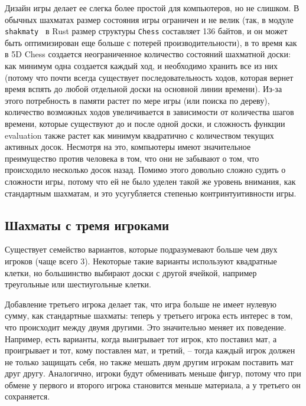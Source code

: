 \documentclass{article}
\begin{document}
Дизайн игры делает ее слегка более простой для компьютеров, но не слишком.
В обычных шахматах размер состояния игры ограничен и не велик
(так, в модуле \texttt{shakmaty}~\cite{shakmaty-crate} в Rust размер структуры \texttt{Chess} составляет 136 байтов,
и он может быть оптимизирован еще больше с потерей производительности),
в то время как в 5D Chess создается неограниченное количество состояний шахматной доски:
как минимум одна создается каждый ход,
и необходимо хранить все из них
(потому что почти всегда существует последовательность ходов,
которая вернет время вспять до любой отдельной доски на основной линии времени).
Из-за этого потребность в памяти растет по мере игры (или поиска по дереву),
количество возможных ходов увеличивается в зависимости от количества шагов времени, которые существуют до и после одной доски,
и сложность функции evaluation также растет как минимум квадратично с количеством текущих активных досок.
Несмотря на это, компьютеры имеют значительное преимущество против человека в том,
что они не забывают о том, что происходило несколько досок назад.
Помимо этого довольно сложно судить о сложности игры,
потому что ей не было уделен такой же уровень внимания, как стандартным шахматам,
и это усугубляется степенью контринтуитивности игры. 

\subsection{Шахматы с тремя игроками}

Существует семейство вариантов,
которые подразумевают больше чем двух игроков
(чаще всего 3).
Некоторые такие варианты используют квадратные клетки,
но большинство выбирают доски с другой ячейкой,
например треугольные или шестиугольные клетки.

Добавление третьего игрока делает так, что игра больше не имеет нулевую сумму,
как стандартные шахматы:
теперь у третьего игрока есть интерес в том, что происходит между двумя другими.
Это значительно меняет их поведение.
Например, есть варианты, когда выигрывает тот игрок, кто поставил мат,
а проигрывает и тот, кому поставлен мат, и третий, -- 
тогда каждый игрок должен не только защищать себя, но также мешать двум другим игрокам поставить мат друг другу.
Аналогично, игроки будут обменивать меньше фигур,
потому что при обмене у первого и второго игрока становится меньше материала,
а у третьего он сохраняется.
\end{document}
